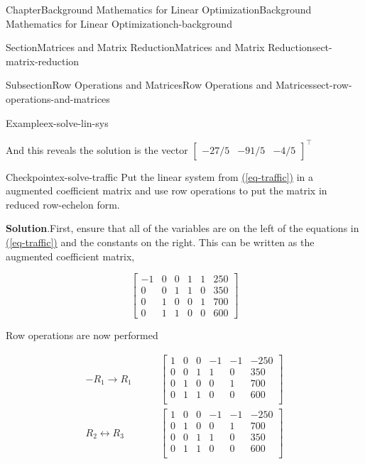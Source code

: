 \documentclass[oneside,10pt,]{book}
\newcommand{\blocktitlefont}{\relax}
\newcommand{\xreffont}{\relax}
\numberwithin{equation}{section}
\newcommand{\amp}{&}
\begin{document}
\begin{chapterptx}{Chapter}{Background Mathematics for Linear Optimization}{}{Background Mathematics for Linear Optimization}{}{}{ch-background}
\begin{sectionptx}{Section}{Matrices and Matrix Reduction}{}{Matrices and Matrix Reduction}{}{}{sect-matrix-reduction}
\begin{subsectionptx}{Subsection}{Row Operations and Matrices}{}{Row Operations and Matrices}{}{}{sect-row-operations-and-matrices}
\begin{example}{Example}{}{ex-solve-lin-sys}
%
\par
And this reveals the solution is the vector \(\begin{bmatrix} -27/5 \amp -91/5 \amp -4/5 \end{bmatrix}^{\intercal}\)%
\end{example}
\begin{inlineexercise}{Checkpoint}{}{ex-solve-traffic}%
Put the linear system from \hyperref[eq-traffic]{({\xreffont\ref{eq-traffic}})} in a augmented coefficient matrix and use row operations to put the matrix in reduced row-echelon form.%
\par\smallskip%
\noindent\textbf{\blocktitlefont Solution}.\hypertarget{ex-solve-traffic-2}{}\quad{}First, ensure that all of the variables are on the left of the equations in \hyperref[eq-traffic]{({\xreffont\ref{eq-traffic}})} and the constants on the right. This can be written as the augmented coefficient matrix,%
\par
%
\begin{equation*}
\left[\begin{array}{rrrrr|r} -1 \amp 0 \amp 0 \amp 1 \amp 1 \amp 250 \\ 0 \amp 0 \amp 1 \amp 1 \amp 0 \amp 350 \\ 0 \amp 1 \amp 0 \amp 0 \amp 1 \amp 700 \\ 0 \amp 1 \amp 1 \amp 0 \amp 0 \amp 600 \end{array}\right]
\end{equation*}
%
\par
Row operations are now performed%
\par
%
\begin{align*}
-R_1 \to R_1 \qquad \amp \left[\begin{array}{rrrrr|r} 1 \amp 0 \amp 0 \amp -1 \amp -1 \amp -250\\ 0 \amp 0 \amp 1 \amp 1 \amp 0 \amp 350\\ 0 \amp 1 \amp 0 \amp 0 \amp 1 \amp 700\\ 0 \amp 1 \amp 1 \amp 0 \amp 0 \amp 600\\ \end{array} \right] \\
R_2 \leftrightarrow R_3 \qquad \amp \left[\begin{array}{rrrrr|r} 1 \amp 0 \amp 0 \amp -1 \amp -1 \amp -250\\ 0 \amp 1 \amp 0 \amp 0 \amp 1 \amp 700\\ 0 \amp 0 \amp 1 \amp 1 \amp 0 \amp 350\\ 0 \amp 1 \amp 1 \amp 0 \amp 0 \amp 600\\ \end{array} \right] \\

\end{align*}
\end{inlineexercise}
\end{subsectionptx}
\end{sectionptx}
\end{chapterptx}
\end{document}
